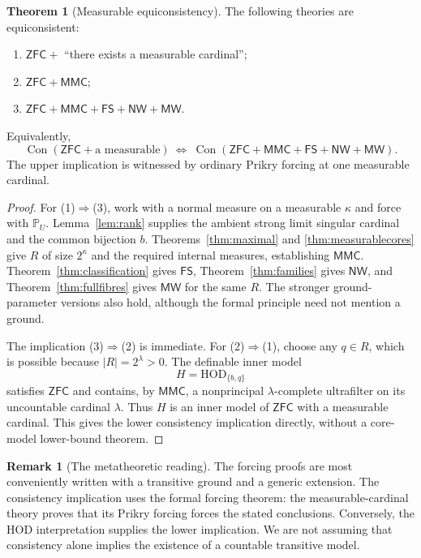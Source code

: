 \documentclass[11pt,letterpaper]{article}
\theoremstyle{definition}
\newtheorem{theorem}[definition]{Theorem}
\newtheorem{remark}[definition]{Remark}
\numberwithin{equation}{section}
\newcommand{\ZFC}{\mathsf{ZFC}}
\newcommand{\HOD}{\mathrm{HOD}}
\newcommand{\Con}{\operatorname{Con}}
\newcommand{\PP}{\mathbb P}
\newcommand{\MMC}{\mathsf{MMC}}
\newcommand{\FS}{\mathsf{FS}}
\newcommand{\NW}{\mathsf{NW}}
\newcommand{\MW}{\mathsf{MW}}
\begin{document}
\begin{theorem}[Measurable equiconsistency]\label{thm:consistency}
The following theories are equiconsistent:
\begin{enumerate}
\item $\ZFC+$ ``there exists a measurable cardinal'';
\item $\ZFC+\MMC$;
\item $\ZFC+\MMC+\FS+\NW+\MW$.
\end{enumerate}
Equivalently,
\begin{equation}\label{eq:equiconsistency}
\Con(\ZFC+\text{a measurable})
\ \Longleftrightarrow\
\Con(\ZFC+\MMC+\FS+\NW+\MW).
\end{equation}
The upper implication is witnessed by ordinary Prikry forcing at one measurable cardinal.
\end{theorem}
\begin{proof}
For (1)$\Rightarrow$(3), work with a normal measure on a measurable $\kappa$ and force with $\PP_U$. Lemma~\ref{lem:rank} supplies the ambient strong limit singular cardinal and the common bijection $b$. Theorems~\ref{thm:maximal} and \ref{thm:measurablecores} give $R$ of size $2^\kappa$ and the required internal measures, establishing $\MMC$. Theorem~\ref{thm:classification} gives $\FS$, Theorem~\ref{thm:families} gives $\NW$, and Theorem~\ref{thm:fullfibres} gives $\MW$ for the same $R$. The stronger ground-parameter versions also hold, although the formal principle need not mention a ground.

The implication (3)$\Rightarrow$(2) is immediate. For (2)$\Rightarrow$(1), choose any $q\in R$, which is possible because $|R|=2^\lambda>0$. The definable inner model
\[
H=\HOD_{\{b,q\}}
\]
satisfies $\ZFC$ and contains, by $\MMC$, a nonprincipal $\lambda$-complete ultrafilter on its uncountable cardinal $\lambda$. Thus $H$ is an inner model of $\ZFC$ with a measurable cardinal. This gives the lower consistency implication directly, without a core-model lower-bound theorem.
\end{proof}

\begin{remark}[The metatheoretic reading]\label{rem:models}
The forcing proofs are most conveniently written with a transitive ground and a generic extension. The consistency implication uses the formal forcing theorem: the measurable-cardinal theory proves that its Prikry forcing forces the stated conclusions. Conversely, the HOD interpretation supplies the lower implication. We are not assuming that consistency alone implies the existence of a countable transitive model.
\end{remark}
\end{document}
